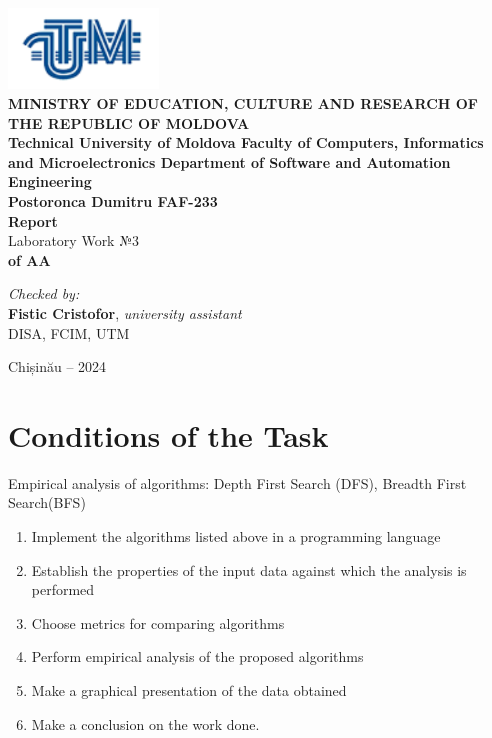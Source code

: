 \documentclass[12pt]{article}
\begin{document}
\begin{titlepage}
\begin{center}
    \includegraphics[width=0.3\textwidth]{image.png} \\[0.2cm]
    
    \textbf{MINISTRY OF EDUCATION, CULTURE AND RESEARCH 
OF THE REPUBLIC OF MOLDOVA} \\[0.3cm]
    
    \textbf{Technical University of Moldova 
Faculty of Computers, Informatics and Microelectronics 
Department of Software and Automation Engineering} \\[2cm]
    
    \textbf{Postoronca Dumitru FAF-233}\\[0.5cm]
    
    \Huge \textbf{Report} \\[0.5cm]
    
    \large Laboratory Work №3\\[0.5cm]
    
    \textbf{of AA} \\[3cm]
    
    \begin{flushright}
        \textit{Checked by:} \\
        \textbf{Fistic Cristofor}, \textit{university assistant} \\
        DISA, FCIM, UTM
    \end{flushright}
    
    \vfill
    
    Chișinău -- 2024
\end{center}
\end{titlepage}


\newpage
\setcounter{page}{1}
\pagestyle{fancy}
\fancyhf{}
\rhead{\thepage}

\section*{Conditions of the Task}
Empirical analysis of algorithms: Depth First Search (DFS), Breadth First Search(BFS)
\begin{enumerate}
    \item Implement the algorithms listed above in a programming language
    \item Establish the properties of the input data against which the analysis is performed
    \item Choose metrics for comparing algorithms
    \item Perform empirical analysis of the proposed algorithms
    \item Make a graphical presentation of the data obtained
    \item Make a conclusion on the work done.
\end{enumerate}
\end{document}
